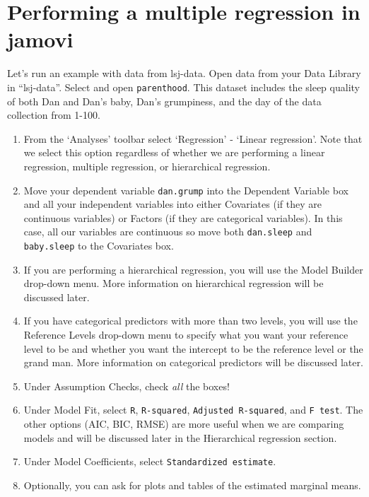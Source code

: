 \documentclass[
]{book}
\begin{document}
\hypertarget{performing-a-multiple-regression-in-jamovi}{%
\section{Performing a multiple regression in jamovi}\label{performing-a-multiple-regression-in-jamovi}}

Let's run an example with data from lsj-data. Open data from your Data Library in ``lsj-data''. Select and open \texttt{parenthood}. This dataset includes the sleep quality of both Dan and Dan's baby, Dan's grumpiness, and the day of the data collection from 1-100.

\begin{enumerate}
\def\labelenumi{\arabic{enumi}.}
\item
  From the `Analyses' toolbar select `Regression' - `Linear regression'. Note that we select this option regardless of whether we are performing a linear regression, multiple regression, or hierarchical regression.
\item
  Move your dependent variable \texttt{dan.grump} into the Dependent Variable box and all your independent variables into either Covariates (if they are continuous variables) or Factors (if they are categorical variables). In this case, all our variables are continuous so move both \texttt{dan.sleep} and \texttt{baby.sleep} to the Covariates box.
\item
  If you are performing a hierarchical regression, you will use the Model Builder drop-down menu. More information on hierarchical regression will be discussed later.
\item
  If you have categorical predictors with more than two levels, you will use the Reference Levels drop-down menu to specify what you want your reference level to be and whether you want the intercept to be the reference level or the grand man. More information on categorical predictors will be discussed later.
\item
  Under Assumption Checks, check \emph{all} the boxes!
\item
  Under Model Fit, select \texttt{R}, \texttt{R-squared}, \texttt{Adjusted\ R-squared}, and \texttt{F\ test}. The other options (AIC, BIC, RMSE) are more useful when we are comparing models and will be discussed later in the Hierarchical regression section.
\item
  Under Model Coefficients, select \texttt{Standardized\ estimate}.
\item
  Optionally, you can ask for plots and tables of the estimated marginal means.
\end{enumerate}
\end{document}
